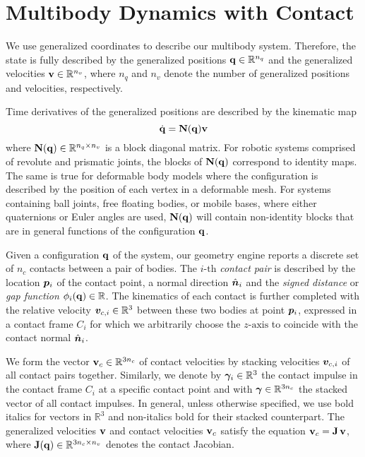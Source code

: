 \section{Multibody Dynamics with Contact}
\label{sec:multibody_dynamics_with_contact}

We use generalized coordinates to describe our multibody system. Therefore, the
state is fully described by the generalized positions
${\mathbf{q}}\in\mathbb{R}^{n_q}$ and the generalized velocities
${\mathbf{v}}\in\mathbb{R}^{n_v}$, where $n_q$ and $n_v$ denote the number of
generalized positions and velocities, respectively.

Time derivatives of the generalized positions are described by the kinematic map
\begin{equation}
	\dot{\mf{q}} = \mf{N}(\mf{q})\mf{v}
	\label{eq:kinematic_map}
\end{equation}
where ${\mathbf{N}}({\mathbf{q}})\in\mathbb{R}^{n_q\times n_v}$ is a block diagonal matrix.
For robotic systems comprised of revolute and prismatic joints, the blocks of
${\mathbf{N}}({\mathbf{q}})$ correspond to identity maps. The same is true for deformable
body models where the configuration is described by the position of each
vertex in a deformable mesh. For systems containing ball joints, free floating
bodies, or mobile bases, where either quaternions or Euler angles are used,
${\mathbf{N}}({\mathbf{q}})$ will contain non-identity blocks that are in general functions
of the configuration ${\mathbf{q}}$.

Given a configuration ${\mathbf{q}}$ of the system, our geometry engine reports a
discrete set of $n_c$ contacts between a pair of bodies. The $i\text{-th}$
\emph{contact pair} is described by the location ${\bm{p}}_i$ of the contact
point, a normal direction $\hat{{\bm{n}}}_i$ and the \emph{signed distance} or
\emph{gap function} $\phi_i({\mathbf{q}})\in\mathbb{R}$. The kinematics of each
contact is further completed with the relative velocity
${\bm{v}}_{c,i}\in\mathbb{R}^3$ between these two bodies at point ${\bm{p}}_i$,
expressed in a contact frame $C_i$ for which we arbitrarily choose the
$z\text{-axis}$ to coincide with the contact normal $\hat{{\bm{n}}}_i$.

We form the vector ${\mathbf{v}}_{c}\in\mathbb{R}^{3n_c}$ of contact velocities by
stacking velocities ${\bm{v}}_{c,i}$ of all contact pairs together. Similarly, we
denote by ${\bm\gamma}_i\in\mathbb{R}^3$ the contact impulse in the contact frame $C_i$ at a specific contact
point and with ${\bm\gamma}\in\mathbb{R}^{3n_c}$ the stacked vector of all contact impulses.
In general, unless otherwise specified, we use bold italics for vectors in
$\mathbb{R}^3$ and non-italics bold for their stacked counterpart. The
generalized velocities ${\mathbf{v}}$ and contact velocities ${\mathbf{v}}_c$ satisfy the
equation ${\mathbf{v}}_c={\mathbf{J}}\,{\mathbf{v}}$, where
${\mathbf{J}}({\mathbf{q}})\in\mathbb{R}^{3n_c\times n_v}$ denotes the contact Jacobian.


